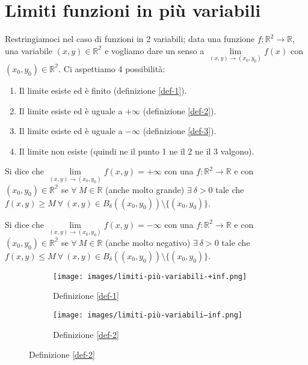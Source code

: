 \newpage
\section{Limiti funzioni in più variabili}
Restringiamoci nel caso di funzioni in 2 variabili; data una funzione $f: \mathbb{R}^2 \to \mathbb{R}$, una variabile $(x,y) \in \mathbb{R^2}$ e vogliamo dare un senso a $\lim\limits_{(x,y) \to (x_0, y_0)}f(x)$ con $(x_0, y_0) \in \mathbb{R^2}$. Ci aspettiamo 4 possibilità:
\begin{enumerate}
    \item Il limite esiste ed è finito (definizione \ref{def-1}).
    \item Il limite esiste ed è uguale a $+\infty$ (definizione \ref{def-2}).
    \item Il limite esiste ed è uguale a $-\infty$ (definizione \ref{def-3}).
    \item Il limite non esiste (quindi ne il punto 1 ne il 2 ne il 3 valgono).
\end{enumerate}

\begin{definition}\label{def-1}
Si dice che $\lim\limits_{(x,y) \to (x_0, y_0)} f(x,y) = +\infty$ con una $f: \mathbb{R}^2 \to \mathbb{R}$ e con $(x_0, y_0) \in \mathbb{R^2}$ se $\forall \: M \in \mathbb{R}$ (anche molto grande) $\exists \: \delta > 0$ tale che $f(x,y) \geq M \:\forall \: (x,y) \in B_{\delta}((x_0, y_0)) \setminus \{(x_0, y_0)\}$.
\end{definition}

\begin{definition}\label{def-2}
Si dice che $\lim\limits_{(x,y) \to (x_0, y_0)} f(x,y) = -\infty$ con una $f: \mathbb{R}^2 \to \mathbb{R}$ e con $(x_0, y_0) \in \mathbb{R^2}$ se $\forall \: M \in \mathbb{R}$ (anche molto negativo) $\exists \: \delta > 0$ tale che $f(x,y) \leq M \:\forall \: (x,y) \in B_{\delta}((x_0, y_0)) \setminus \{(x_0, y_0)\}$.
\end{definition}

\begin{figure}[h!]
\centering
\begin{subfigure}{.45\textwidth}
    \centering
    \texttt{[image: images/limiti-più-variabili-+inf.png]}
    \caption{Definizione \ref{def-1}}
\end{subfigure}
\begin{subfigure}{.45\textwidth}
    \centering
    \texttt{[image: images/limiti-più-variabili--inf.png]}
    \caption{Definizione \ref{def-2}}
\end{subfigure}
\end{figure}

